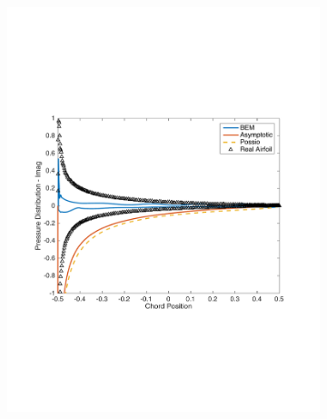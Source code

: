 \documentclass{article}
\begin{document}
\begin{figure}[h]
\begin{subfigure}{0.3\textwidth}
	\includegraphics[width = \textwidth, height=0.16\textheight]{NACA1101_pressure_k15imag}
\end{subfigure}%
\begin{subfigure}{0.33\textwidth}
	\centering

\end{subfigure}
\end{figure}
\end{document}
